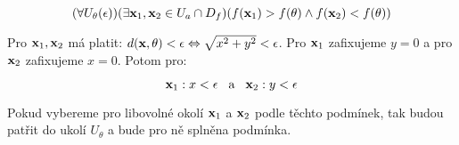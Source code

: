 \[ (\forall U_\theta(\epsilon))(\exists \mathbf{x}_1, \mathbf{x}_2 \in U_a \cap D_f)(f(\mathbf{x}_1) > f(\theta) \wedge f(\mathbf{x}_2) < f(\theta)) \]

\noindent Pro $\mathbf{x}_1, \mathbf{x}_2$ má platit: $d(\mathbf{x}, \theta) < \epsilon \Leftrightarrow \sqrt{x^2 + y^2} < \epsilon$.
Pro $\mathbf{x}_1$ zafixujeme $y = 0$ a pro $\mathbf{x}_2$ zafixujeme $x = 0$. Potom pro:

\[ \mathbf{x}_1: x < \epsilon \hspace{3mm} \text{a} \hspace{3mm} \mathbf{x}_2: y < \epsilon \]

\noindent Pokud vybereme pro libovolné okolí $\mathbf{x}_1$ a $\mathbf{x}_2$ podle těchto podmínek, tak budou patřit do ukolí $U_\theta$ a bude pro ně splněna podmínka.

\pagebreak
